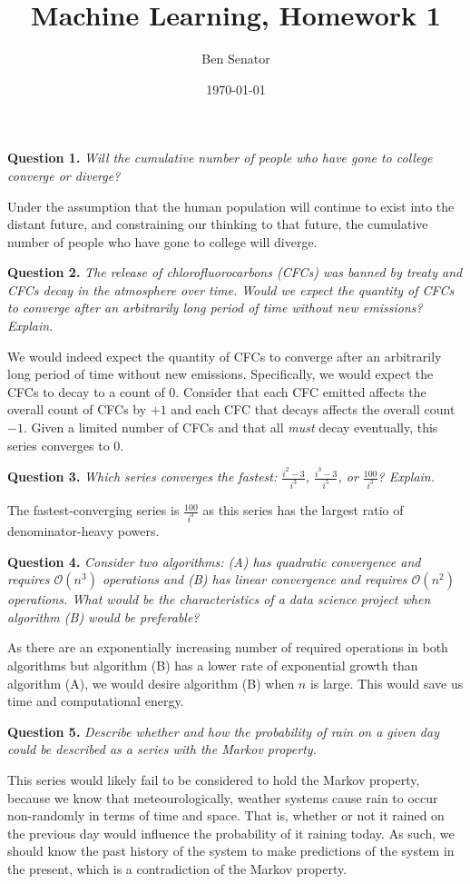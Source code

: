 \documentclass[11pt]{article}
\title{Machine Learning, Homework 1}
\author{Ben Senator}
\date{\today}
\begin{document}
\maketitle

\textbf{Question 1.} \textit{Will the cumulative number of people who have gone to college converge or diverge?}

Under the assumption that the human population will continue to exist into the distant future, and constraining our thinking to that future, the cumulative number of people who have gone to college will diverge.

\textbf{Question 2.} \textit{The release of chlorofluorocarbons (CFCs) was banned by treaty and CFCs decay in the atmosphere over time. Would we expect the quantity of CFCs to converge after an arbitrarily long period of time without new emissions? Explain.}

We would indeed expect the quantity of CFCs to converge after an arbitrarily long period of time without new emissions. 
Specifically, we would expect the CFCs to decay to a count of 0. 
Consider that each CFC emitted affects the overall count of CFCs by $+1$ and each CFC that decays affects the overall count $-1$.
Given a limited number of CFCs and that all \textit{must} decay eventually, this series converges to 0.

\textbf{Question 3.} \textit{Which series converges the fastest: $\frac{i^2-3}{i^3}$, $\frac{i^3-3}{i^5}$, or $\frac{100}{i^3}$? Explain.}

The fastest-converging series is $\frac{100}{i^3}$ as this series has the largest ratio of denominator-heavy powers.

\textbf{Question 4.} \textit{Consider two algorithms: (A) has quadratic convergence and requires $\mathcal{O}(n^3)$ operations and (B) has linear convergence and requires $\mathcal{O}(n^2)$ operations. What would be the characteristics of a data science project when algorithm (B) would be preferable?}

As there are an exponentially increasing number of required operations in both algorithms but algorithm (B) has a lower rate of exponential growth than algorithm (A), we would desire algorithm (B) when $n$ is large.
This would save us time and computational energy.

\textbf{Question 5.} \textit{Describe whether and how the probability of rain on a given day could be described as a series with the Markov property.}

This series would likely fail to be considered to hold the Markov property, because we know that meteourologically, weather systems cause rain to occur non-randomly in terms of time and space.
That is, whether or not it rained on the previous day would influence the probability of it raining today.
As such, we should know the past history of the system to make predictions of the system in the present, which is a contradiction of the Markov property. 
\end{document}
